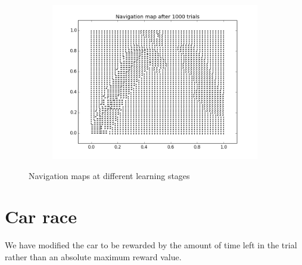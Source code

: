 \begin{figure}[H!]
\begin{subfigure}[h!]{0.6\textwidth}
    \includegraphics[width=\textwidth]{figures/nmap_1000.png}
\end{subfigure}
\caption{\label{fig:navmap}Navigation maps at different learning stages}
\end{figure}   


%
%
%
%

\section{Car race}
We have modified the car to be rewarded by the amount of time left in the trial rather than an absolute maximum reward value. 
